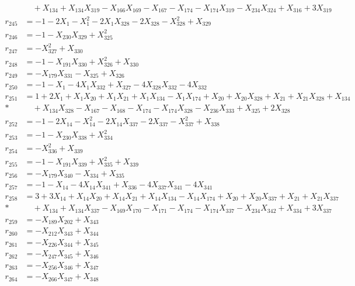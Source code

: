 \begin{align*}
&\quad  + X_{134} + X_{134}X_{319} - X_{166}X_{169} - X_{167} - X_{174} - X_{174}X_{319} - X_{234}X_{324} + X_{316} + 3X_{319} \\[3pt]
r_{245} &= -1 - 2X_{1} - X_{1}^{2} - 2X_{1}X_{328} - 2X_{328} - X_{328}^{2} + X_{329} \\[3pt]
r_{246} &= -1 - X_{230}X_{329} + X_{325}^{2} \\[3pt]
r_{247} &= -X_{327}^{2} + X_{330} \\[3pt]
r_{248} &= -1 - X_{191}X_{330} + X_{326}^{2} + X_{330} \\[3pt]
r_{249} &= -X_{179}X_{331} - X_{325} + X_{326} \\[3pt]
r_{250} &= -1 - X_{1} - 4X_{1}X_{332} + X_{327} - 4X_{328}X_{332} - 4X_{332} \\[3pt]
r_{251} &= 1 + 2X_{1} + X_{1}X_{20} + X_{1}X_{21} + X_{1}X_{134} - X_{1}X_{174} + X_{20} + X_{20}X_{328} + X_{21} + X_{21}X_{328} + X_{134} \\*
&\quad  + X_{134}X_{328} - X_{167} - X_{168} - X_{174} - X_{174}X_{328} - X_{236}X_{333} + X_{325} + 2X_{328} \\[3pt]
r_{252} &= -1 - 2X_{14} - X_{14}^{2} - 2X_{14}X_{337} - 2X_{337} - X_{337}^{2} + X_{338} \\[3pt]
r_{253} &= -1 - X_{230}X_{338} + X_{334}^{2} \\[3pt]
r_{254} &= -X_{336}^{2} + X_{339} \\[3pt]
r_{255} &= -1 - X_{191}X_{339} + X_{335}^{2} + X_{339} \\[3pt]
r_{256} &= -X_{179}X_{340} - X_{334} + X_{335} \\[3pt]
r_{257} &= -1 - X_{14} - 4X_{14}X_{341} + X_{336} - 4X_{337}X_{341} - 4X_{341} \\[3pt]
r_{258} &= 3 + 3X_{14} + X_{14}X_{20} + X_{14}X_{21} + X_{14}X_{134} - X_{14}X_{174} + X_{20} + X_{20}X_{337} + X_{21} + X_{21}X_{337} \\*
&\quad  + X_{134} + X_{134}X_{337} - X_{169}X_{170} - X_{171} - X_{174} - X_{174}X_{337} - X_{234}X_{342} + X_{334} + 3X_{337} \\[3pt]
r_{259} &= -X_{189}X_{202} + X_{343} \\[3pt]
r_{260} &= -X_{212}X_{343} + X_{344} \\[3pt]
r_{261} &= -X_{226}X_{344} + X_{345} \\[3pt]
r_{262} &= -X_{247}X_{345} + X_{346} \\[3pt]
r_{263} &= -X_{256}X_{346} + X_{347} \\[3pt]
r_{264} &= -X_{266}X_{347} + X_{348} \\[3pt]

\end{align*}
